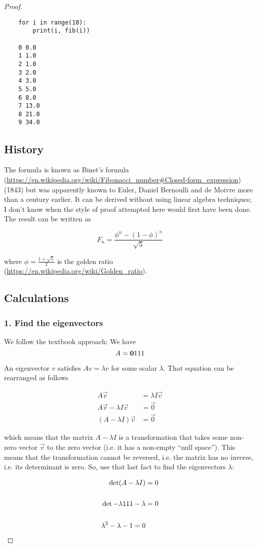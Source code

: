 \begin{proof}
\begin{verbatim}
    for i in range(10):
        print(i, fib(i))

    0 0.0
    1 1.0
    2 1.0
    3 2.0
    4 3.0
    5 5.0
    6 8.0
    7 13.0
    8 21.0
    9 34.0
\end{verbatim}

\subsection*{History}

The formula is known as
Binet's formula (\url{https://en.wikipedia.org/wiki/Fibonacci_number#Closed-form_expression})
(1843) but was apparently known to Euler, Daniel Bernoulli and de Moivre more
than a century earlier. It can be derived without using linear algebra
techniques; I don't know when the style of proof attempted here would first
have been done. The result can be written as

$$
F_n = \frac{\phi^n - (1-\phi)^n}{\sqrt{5}}
$$

where $\phi = \frac{1+\sqrt{5}}{2}$ is the
golden ratio (\url{https://en.wikipedia.org/wiki/Golden_ratio}).


\subsection*{Calculations}

\subsubsection{1. Find the eigenvectors}
We follow the textbook approach: We have
$$
A = \mathbf{0}{1}
        {1}{1}
$$

An eigenvector $v$ satisfies $Av = \lambda v$ for some scalar $\lambda$. That
equation can be rearranged as follows

\begin{align*}
A\vec v &= \lambda I\vec v
\\
A\vec v - \lambda I\vec v &= \vec 0
\\
(A - \lambda I)\vec v &= \vec 0
\end{align*}

which means that the matrix $A - \lambda I$ is a transformation that takes some
non-zero vector $\vec v$ to the zero vector (i.e. it has a non-empty ``null
space''). This means that the transformation cannot be reversed, i.e. the matrix
has no inverse, i.e. its determinant is zero. So, use that last fact to find
the eigenvectors $\lambda$:

\begin{align*}
\det (A - \lambda I) &= 0
\\
\\
\det \mathbf{-\lambda}{1}
         {1          }{1 - \lambda} &= 0
\\
\\
\lambda^2 - \lambda - 1 = 0
\end{align*}


\end{proof}
